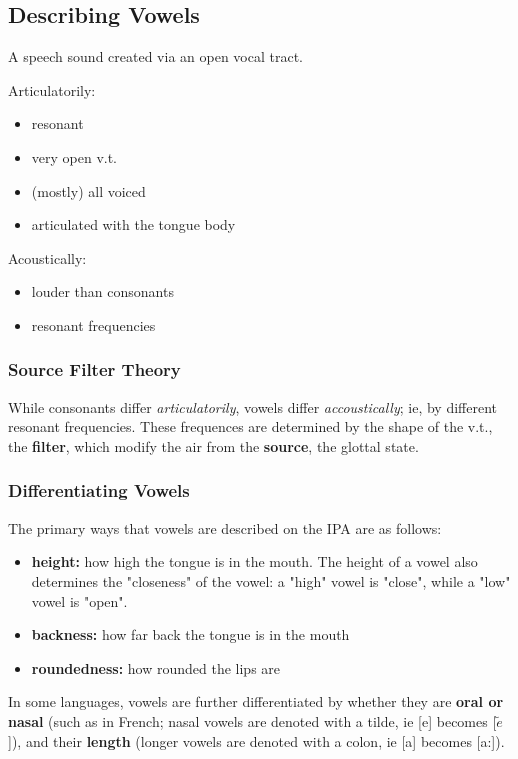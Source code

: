 \documentclass[12pt]{article}
\begin{document}
\subsection{Describing Vowels}
\begin{definitionEnd}[Vowel]
  A speech sound created via an open vocal tract.
\end{definitionEnd}
Articulatorily:
\begin{itemize}
  \item resonant
  \item very open v.t.
  \item (mostly) all voiced
  \item articulated with the tongue body
\end{itemize}

Acoustically:
\begin{itemize}
  \item louder than consonants
  \item resonant frequencies
\end{itemize}

\subsubsection{Source Filter Theory}

While consonants differ \textit{articulatorily}, vowels differ \textit{accoustically}; ie, by different resonant frequencies. These frequences are determined by the shape of the v.t., the \textbf{filter}, which modify the air from the \textbf{source}, the glottal state. 

\subsubsection{Differentiating Vowels}

The primary ways that vowels are described on the IPA are as follows: \begin{itemize}
  \item \textbf{height:} how high the tongue is in the mouth. The height of a vowel also determines the "closeness" of the vowel: a "high" vowel is "close", while a "low" vowel is "open".
  \item \textbf{backness:} how far back the tongue is in the mouth
  \item \textbf{roundedness:} how rounded the lips are
\end{itemize}

In some languages, vowels are further differentiated by whether they are \textbf{oral or nasal} (such as in French; nasal vowels are denoted with a tilde, ie [e] becomes [$\tilde{e}$]), and their \textbf{length} (longer vowels are denoted with a colon, ie [a] becomes [a:]).
\end{document}
